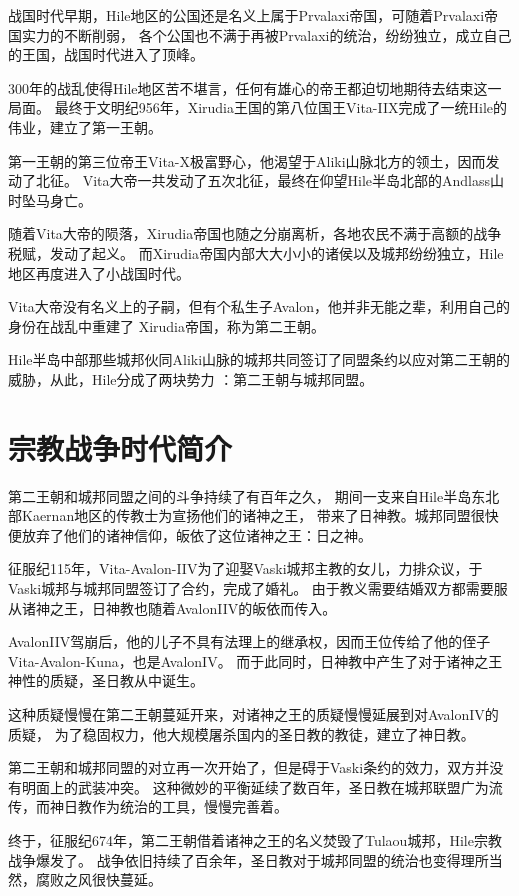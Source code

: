 \documentclass[UTF8,12pt]{ctexbook}
\begin{document}
        战国时代早期，Hile地区的公国还是名义上属于Prvalaxi帝国，可随着Prvalaxi帝国实力的不断削弱，
        各个公国也不满于再被Prvalaxi的统治，纷纷独立，成立自己的王国，战国时代进入了顶峰。
        
        300年的战乱使得Hile地区苦不堪言，任何有雄心的帝王都迫切地期待去结束这一局面。
        最终于文明纪956年，Xirudia王国的第八位国王Vita-IIX完成了一统Hile的伟业，建立了第一王朝。

        第一王朝的第三位帝王Vita-X极富野心，他渴望于Aliki山脉北方的领土，因而发动了北征。
        Vita大帝一共发动了五次北征，最终在仰望Hile半岛北部的Andlass山时坠马身亡。

        随着Vita大帝的陨落，Xirudia帝国也随之分崩离析，各地农民不满于高额的战争税赋，发动了起义。
        而Xirudia帝国内部大大小小的诸侯以及城邦纷纷独立，Hile地区再度进入了小战国时代。

        Vita大帝没有名义上的子嗣，但有个私生子Avalon，他并非无能之辈，利用自己的身份在战乱中重建了
        Xirudia帝国，称为第二王朝。

        Hile半岛中部那些城邦伙同Aliki山脉的城邦共同签订了同盟条约以应对第二王朝的威胁，从此，Hile分成了两块势力
        ：第二王朝与城邦同盟。
    \section{宗教战争时代简介}
        第二王朝和城邦同盟之间的斗争持续了有百年之久，
        期间一支来自Hile半岛东北部Kaernan地区的传教士为宣扬他们的诸神之王，
        带来了日神教。城邦同盟很快便放弃了他们的诸神信仰，皈依了这位诸神之王：日之神。

        征服纪115年，Vita-Avalon-IIV为了迎娶Vaski城邦主教的女儿，力排众议，于Vaski城邦与城邦同盟签订了合约，完成了婚礼。
        由于教义需要结婚双方都需要服从诸神之王，日神教也随着AvalonIIV的皈依而传入。

        AvalonIIV驾崩后，他的儿子不具有法理上的继承权，因而王位传给了他的侄子Vita-Avalon-Kuna，也是AvalonIV。
        而于此同时，日神教中产生了对于诸神之王神性的质疑，圣日教从中诞生。

        这种质疑慢慢在第二王朝蔓延开来，对诸神之王的质疑慢慢延展到对AvalonIV的质疑，
        为了稳固权力，他大规模屠杀国内的圣日教的教徒，建立了神日教。

        第二王朝和城邦同盟的对立再一次开始了，但是碍于Vaski条约的效力，双方并没有明面上的武装冲突。
        这种微妙的平衡延续了数百年，圣日教在城邦联盟广为流传，而神日教作为统治的工具，慢慢完善着。

        终于，征服纪674年，第二王朝借着诸神之王的名义焚毁了Tulaou城邦，Hile宗教战争爆发了。
        战争依旧持续了百余年，圣日教对于城邦同盟的统治也变得理所当然，腐败之风很快蔓延。
\end{document}
